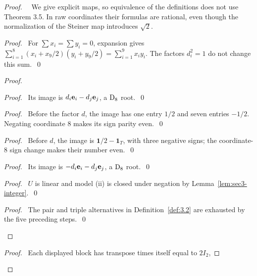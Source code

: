 \begin{proof}
 \pfsketch\ \new\ We give explicit maps, so equivalence of the definitions does not
 use Theorem 3.5. In raw coordinates their formulas are rational, even though the
 normalization of the Steiner map introduces $\sqrt2$.
 \begin{proof}\pf\ For $\sum x_i=\sum y_i=0$, expansion gives
  $\sum_{i=1}^8(x_i+x_9/2)(y_i+y_9/2)=\sum_{i=1}^9x_iy_i$.
  The factors $d_i^2=1$ do not change this sum.~\qed\end{proof}
 \begin{proof}
  \begin{proof}\pf\ Its image is $d_i{\mathbf e}_i-d_j{\mathbf e}_j$, a $\mathrm{D}_8$ root.~\qed\end{proof}
  \begin{proof}\pf\ Before the factor $d$, the image has one entry $1/2$ and
   seven entries $-1/2$. Negating coordinate 8 makes its sign parity even.~\qed\end{proof}
  \begin{proof}\pf\ Before $d$, the image is $\mathbf1/2-\mathbf1_T$, with
   three negative signs; the coordinate-8 sign change makes their number even.~\qed\end{proof}
  \begin{proof}\pf\ Its image is $-d_i{\mathbf e}_i-d_j{\mathbf e}_j$, a $\mathrm{D}_8$ root.~\qed\end{proof}
  \begin{proof}\pf\ $U$ is linear and model (ii) is closed under negation by
   Lemma~\ref{lem:sec3-integer}.~\qed\end{proof}
  \qedstep
  \begin{proof}\pf\ The pair and triple alternatives in Definition~\ref{def:3.2}
   are exhausted by the five preceding steps.~\qed\end{proof}
 \end{proof}
 \begin{proof}\pf\ Each displayed block has transpose times itself equal to $2I_2$,

\end{proof}
\end{proof}
